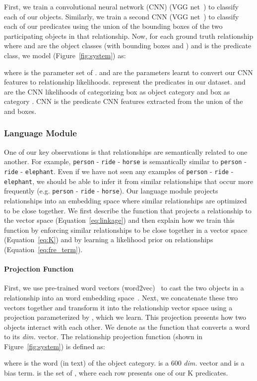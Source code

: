 \documentclass[runningheads]{llncs}
\newcommand{\relationship}[3]{\texttt{#1} - \texttt{#2} - \texttt{#3}}
\newcommand{\eg}[1]{e.g. #1}
\begin{document}
First, we train a convolutional neural network (CNN) (VGG net~\cite{simonyan2014very}) to classify each of our  objects. Similarly, we train a second CNN (VGG net~\cite{simonyan2014very}) to classify each of our  predicates using the union of the bounding boxes of the two participating objects in that relationship. Now, for each ground truth relationship  where  and  are the object classes (with bounding boxes  and ) and  is the predicate class, we model  (Figure~\ref{fig:system}) as:
{\small

}
where  is the parameter set of .  and  are the parameters learnt to convert our CNN features to relationship likelihoods.  represent the  predicates in our dataset.  and  are the CNN likelihoods of categorizing box  as object category  and box  as category . CNN is the predicate CNN features extracted from the union of the  and  boxes.


\subsubsection{Language Module}
\label{sec:knowledge}
One of our key observations is that relationships are semantically related to one another. For example, \relationship{person}{ride}{horse} is semantically similar to \relationship{person}{ride}{elephant}. Even if we have not seen any examples of \relationship{person}{ride}{elephant}, we should be able to infer it from similar relationships that occur more frequently (\eg \relationship{person}{ride}{horse}). Our language module projects relationships into an embedding space where similar relationships are optimized to be close together. We first describe the function that projects a relationship to the vector space (Equation~\ref{eq:linkage}) and then explain how we train this function by enforcing similar relationships to be close together in a vector space (Equation~\ref{eq:K}) and by learning a likelihood prior on relationships (Equation~\ref{eq:fre_term}).

\paragraph{Projection Function}
First, we use pre-trained word vectors (word2vec)~\cite{mikolov2013efficient} to cast the two objects in a relationship into an word embedding space~\cite{mikolov2013efficient}. Next, we concatenate these two vectors together and transform it into the relationship vector space using a projection parameterized by , which we learn. This projection presents how two objects interact with each other. We denote  as the function that converts a word to its  \textit{dim.} vector. The relationship projection function (shown in Figure~\ref{fig:system}) is defined as:
{\small

}
where  is the word (in text) of the  object category.  is a 600 \textit{dim.} vector and  is a bias term.   is the set of , where each row presents one of our K predicates.
\end{document}
